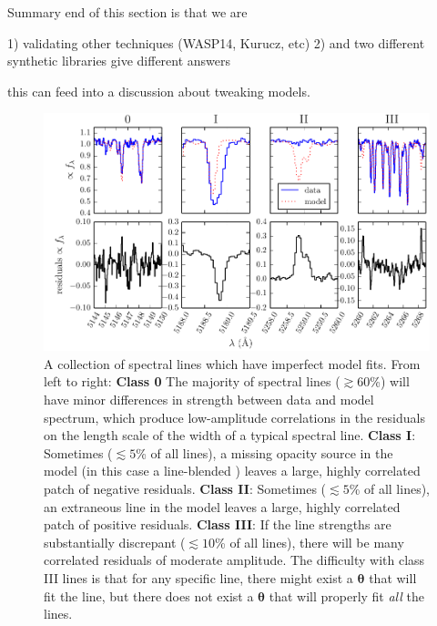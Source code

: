 \documentclass[iop,floatfix]{emulateapj}
\newcommand{\vt}{ {\bm \theta}}
\newcommand{\vt}{ {\bm \theta}}
\newcommand{\stellarParameters}{\vt}
\begin{document}
Summary end of this section is that we are

1) validating other techniques (WASP14, Kurucz, etc)
2) and two different synthetic libraries give different answers

this can feed into a discussion about tweaking models.

\begin{figure}[!htb]
\begin{center}
  \includegraphics{figs/badlines.pdf}
  \caption{A collection of spectral lines which have imperfect model fits.
    From left to right: \textbf{Class 0} The majority of spectral lines
    ($\gtrsim 60$\%) will have minor differences in strength between data and
    model spectrum, which produce low-amplitude correlations in the residuals
    on the length scale of the width of a typical spectral line.  \textbf{Class
    I}: Sometimes ($\lesssim 5$\% of all lines), a missing opacity source in
    the model (in this case a line-blended ) leaves a large, highly correlated
    patch of negative residuals.  \textbf{Class II}: Sometimes ($\lesssim 5$\%
    of all lines), an extraneous line in the model leaves a large, highly
    correlated patch of positive residuals.  \textbf{Class III}: If the line strengths are
    substantially discrepant ($\lesssim 10$\% of all lines), there will be many
    correlated residuals of moderate amplitude.  The difficulty
    with class III lines is that for any specific line, there might exist a
    $\stellarParameters$ that will fit the line, but there does not exist a $\stellarParameters$ that
    will properly fit \emph{all} the lines.}
\label{fig:badlines}
\end{center}
\end{figure}
\end{document}
